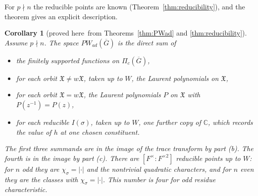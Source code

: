 \documentclass[12pt,letterpaper]{article}
\numberwithin{equation}{section}
\newtheorem{xcorollary}[theorem]{Corollary}
\theoremstyle{definition}
\newcommand{\proved}{proved here}
\newcommand{\C}{\mathbb C}
\newcommand{\bG}{\overline{G}}
\newcommand{\fX}{\mathfrak X}
\begin{document}
For $p\nmid n$ the reducible points are known (Theorem~\ref{thm:reducibility}), and the
theorem gives an explicit description.

\begin{xcorollary}[\proved\ from Theorems~\ref{thm:PWad} and \ref{thm:reducibility}]\label{cor:PWad-explicit}
Assume $p\nmid n$.  The space $PW_{ad}(\bG)$ is the direct sum of
\begin{itemize}[leftmargin=*,itemsep=1pt]
\item the finitely supported functions on $\Pi_c(\bG)$,
\item for each orbit $\fX\ne w\fX$, taken up to $W$, the Laurent polynomials on $\fX$,
\item for each orbit $\fX=w\fX$, the Laurent polynomials $P$ on $\fX$ with $P(z^{-1})=P(z)$,
\item for each reducible $I(\sigma)$, taken up to $W$, one further copy of $\C$, which
records the value of $h$ at one chosen constituent.
\end{itemize}
The first three summands are in the image of the trace transform by part (b).  The fourth
is in the image by part (c). There are $[F^\times:F^{\times2}]$ reducible points
up to $W$: for $n$ odd they are $\chi_\sigma=|\cdot|$ and the nontrivial
quadratic characters, and for $n$ even they are the classes with
$\chi_\sigma=|\cdot|$. This number is four for odd residue characteristic.
\end{xcorollary}
\end{document}
